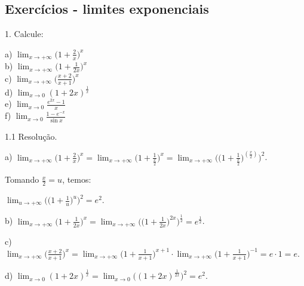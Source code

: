 \documentclass{article}
\begin{document}
{\begin{newpage}
\subsection{Exercícios - limites exponenciais}
\par
\begin{flushleft}
1. Calcule:
\end{flushleft}
\par
\begin{multicols}{3}
\hspace{-15pt}a) $\displaystyle{\lim_{x\to +\infty }} \Big(1 + \frac{2}{x}\Big)^x$ \\
b) $\displaystyle{\lim_{x\to +\infty }} \Big(1 + \frac{1}{2x}\Big)^x$ \\
c) $\displaystyle{\lim_{x\to +\infty }} \Big(\frac{x+2}{x+1}\Big)^x$ \\
d) $\displaystyle{\lim_{x\to 0}} (1+2x)^{\frac{1}{x}}$ \\
e) $\displaystyle{\lim_{x\to 0}} \frac{e^{2x} - 1}{x}$ \\
f) $\displaystyle{\lim_{x\to 0}} \frac{1 - e^{-x}}{\sin{x}}$
\end{multicols}
\par
\vspace{0.3cm}
\begin{flushleft}
1.1 Resolução.
\end{flushleft}
\par
a) $\displaystyle{\lim_{x\to +\infty }\Big(1+\frac{2}{x}\Big)^x=\lim_{x\to +\infty }\Big(1+\frac{1}{\frac{x}{2}}\Big)^x=\lim_{x\to +\infty}\Big(\Big(1+\frac{1}{\frac{x}{2}}\Big)^{(\frac{x}{2})}\Big)^2}$.
\par
\vspace{0.3cm}
Tomando $\frac{x}{2}=u$, temos:
\par $\displaystyle{\lim_{u\to +\infty }} \Big(\Big(1 + \frac{1}{u}\Big)^{u}\Big)^2 = e^2 $.
\par
\vspace{0.3cm}
b) $\displaystyle{\lim_{x\to +\infty } \Big(1 + \frac{1}{2x}\Big)^x = \lim_{x\to +\infty } \Big(\Big(1 + \frac{1}{2x}\Big)^{2x}\Big)^{\frac{1}{2}} = e^{\frac{1}{2}}}$.
\par
\vspace{0.3cm}
c) $\displaystyle{\lim_{x\to +\infty } \Big(\frac{x+2}{x+1}\Big)^x = \lim_{x\to +\infty } \Big(1 + \frac{1}{x+1}\Big)^{x+1}\cdot\lim_{x\to +\infty } \Big(1 + \frac{1}{x+1}\Big)^{-1} = e\cdot1 = e}$.
\par
\vspace{0.3cm}
d) $\displaystyle{\lim_{x\to 0} (1+2x)^{\frac{1}{x}} = \lim_{x\to 0} \Big((1+2x)^{\frac{1}{2x}}\Big)^2 = e^2}$.

\end{newpage}}
\end{document}
